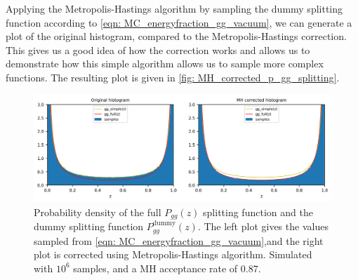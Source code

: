 \documentclass[main.tex]{subfiles}
\begin{document}
Applying the Metropolis-Hastings algorithm by sampling the dummy splitting function according to \autoref{eqn: MC_energyfraction_gg_vacuum}, we can generate a plot of the original histogram, compared to the Metropolis-Hastings correction. This gives us a good idea of how the correction works and allows us to demonstrate how this simple algorithm allows us to sample more complex functions. The resulting plot is given in \autoref{fig: MH_corrected_p_gg_splitting}.
\begin{figure}[htb]
    \centering
    \includegraphics[width=15cm]{pictures/plots/Metropolis-Hastings/MH_vacuum_gg.png}
    \caption{Probability density of the full \(P_{gg}(z)\) splitting function and the dummy splitting function \(P_{gg}^{\text{dummy}}(z)\). The left plot gives the values sampled from \autoref{eqn: MC_energyfraction_gg_vacuum},and the right plot is corrected using Metropolis-Hastings algorithm. Simulated with \(10^6\) samples, and a MH acceptance rate of \(0.87\).}
    \label{fig: MH_corrected_p_gg_splitting}
\end{figure}
\end{document}
